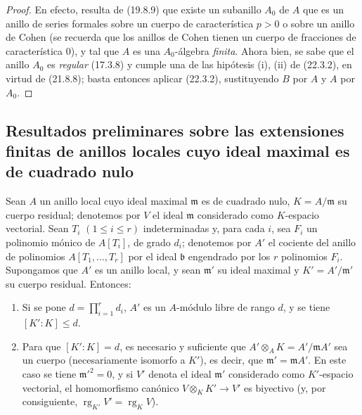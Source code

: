 \begin{proof}
En efecto, resulta de (19.8.9) que existe un subanillo $A_0$ de $A$ que es un
anillo de series formales sobre un cuerpo de característica $p>0$ o sobre un
anillo de Cohen (se recuerda que los anillos de Cohen tienen un cuerpo de
fracciones de característica $0$), y tal que $A$ es una $A_0$-álgebra \emph{finita}.
Ahora bien, se sabe que el anillo $A_0$ es \emph{regular} (17.3.8) y cumple una de las
hipótesis (i), (ii) de (22.3.2), en virtud de (21.8.8); basta entonces aplicar
(22.3.2), sustituyendo $B$ por $A$ y $A$ por $A_0$.
\end{proof}
\subsection{Resultados preliminares sobre las extensiones finitas de anillos locales cuyo ideal maximal es de cuadrado nulo}
\label{subsection:0.22.4-fr}
\label{0.22.4-fr}

\begin{proposition}[22.4.1]
\label{0.22.4.1-fr}
Sean $A$ un anillo local cuyo ideal maximal $\mathfrak m$ es de cuadrado
nulo, $K=A/\mathfrak m$ su cuerpo residual; denotemos por $V$ el ideal
$\mathfrak m$ considerado como $K$-espacio vectorial. Sean $T_i$
$(1\leqslant i\leqslant r)$ indeterminadas y, para cada $i$, sea
$F_i$ un polinomio mónico de $A[T_i]$, de grado $d_i$; denotemos por $A'$ el
cociente del anillo de polinomios $A[T_1,\ldots,T_r]$ por el ideal
$\mathfrak b$ engendrado por los $r$ polinomios $F_i$. Supongamos que $A'$ es
un anillo local, y sean $\mathfrak m'$ su ideal maximal y
$K'=A'/\mathfrak m'$ su cuerpo residual. Entonces:
\begin{enumerate}
  \item[\textup{(i)}] Si se pone $d=\prod_{i=1}^r d_i$, $A'$ es un $A$-módulo
  libre de rango $d$, y se tiene $[K':K]\leqslant d$.
  \item[\textup{(ii)}] Para que $[K':K]=d$, es necesario y suficiente que
  $A'\otimes_AK=A'/\mathfrak mA'$ sea un cuerpo (necesariamente isomorfo a
  $K'$), es decir, que $\mathfrak m'=\mathfrak mA'$. En este caso se tiene
  $\mathfrak m'^2=0$, y si $V'$ denota el ideal $\mathfrak m'$ considerado
  como $K'$-espacio vectorial, el homomorfismo canónico
  $V\otimes_KK'\to V'$ es biyectivo (y, por consiguiente,
  $\operatorname{rg}_{K'}V'=\operatorname{rg}_K V$).
\end{enumerate}
\end{proposition}

